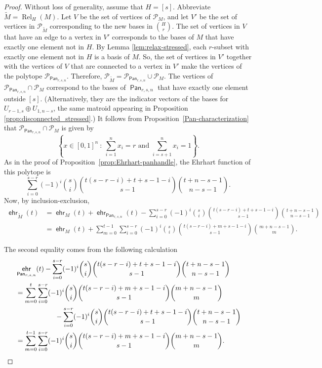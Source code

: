 \documentclass[11pt]{amsart}
\theoremstyle{definition}
\newcommand{\0}{\emptyset}
\newcommand{\Po}{\mathcal{P}}
\DeclareMathOperator{\ehr}{\mathsf{ehr}}
\DeclareMathOperator{\Rel}{Rel} %
\DeclareMathOperator{\Pan}{\mathsf{Pan}} %
\begin{document}
\begin{proof}
Without loss of generality, assume that $H=[s]$.
Abbreviate $\widetilde{M}=\Rel_H(M)$.
Let $V$ be the set of vertices of $\Po_{M}$, and let $V'$ be the set of vertices in $\Po_{\widetilde{M}}$ corresponding to the new bases in $\binom{H}{r}$.
The set of vertices in $V$ that have an edge to a vertex in $V'$ corresponds to the bases of $M$ that have exactly one element not in $H$.
By Lemma \ref{lem:relax-stressed}, each $r$-subset with exactly one element not in $H$ is a basis of $M$.
So, the set of vertices in $V'$ together with the vertices of $V$ that are connected to a vertex in $V'$ make the vertices of the polytope $\Po_{\Pan_{r,s,n}}$.
Therefore, $\Po_{\widetilde{M}}=\Po_{\Pan_{r,s,n}}\cup \Po_{M}$.
The vertices of $\Po_{\Pan_{r,s,n}}\cap \Po_{M}$ correspond to the bases of $\Pan_{r,s,n}$ that have exactly one element outside $[s]$. 
(Alternatively, they are the indicator vectors of the bases for  $U_{r-1,s}\oplus U_{1,n-s}$, the same matroid appearing in Proposition \ref{prop:disconnected_stressed}.)
It follows from Proposition~\ref{Pan-characterization} that $\Po_{\Pan_{r,s,n}}\cap \Po_{M}$ is given by
\[
\left\{x\in [0,1]^n\ :\ \sum_{i=1}^nx_i=r \textrm{ and } \sum_{i=s+1}^n x_i = 1\right\}.
\]
As in the proof of Proposition~\ref{prop:Ehrhart-panhandle}, the Ehrhart function of this polytope is
\[\sum_{i=0}^{s-r}(-1)^i\binom{s}{i}\binom{t(s-r-i)+t+s-1-i}{s-1}\binom{t+n-s-1}{n-s-1}.\]
Now, by inclusion-exclusion,
\begin{align*}
\ehr_{\widetilde{M}}(t)&=\ehr_M(t) + \ehr_{{\Pan_{r,s,n}}}(t) - \sum_{i=0}^{s-r}(-1)^i\binom{s}{i}\binom{t(s-r-i)+t+s-1-i}{s-1}\binom{t+n-s-1}{n-s-1}\\
&=\ehr_M(t) + \sum_{m=0}^{t-1}\sum_{i=0}^{s-r}(-1)^i\binom{s}{i}\binom{t(s-r-i)+m+s-1-i}{s-1}\binom{m+n-s-1}{m}.
\end{align*}

The second equality comes from the following calculation
\begin{align*}
&\ehr_{{\Pan_{r,s,n}}}(t)-\sum_{i=0}^{s-r}(-1)^i\binom{s}{i}\binom{t(s-r-i)+t+s-1-i}{s-1}\binom{t+n-s-1}{n-s-1}\\
&=\sum_{m=0}^t\sum_{i=0}^{s-r}(-1)^i\binom{s}{i}\binom{t(s-r-i)+m+s-1-i}{s-1}\binom{m+n-s-1}{m}\\
&\hspace{2cm}-\sum_{i=0}^{s-r}(-1)^i\binom{s}{i}\binom{t(s-r-i)+t+s-1-i}{s-1}\binom{t+n-s-1}{n-s-1}\\
&=\sum_{m=0}^{t-1}\sum_{i=0}^{s-r}(-1)^i\binom{s}{i}\binom{t(s-r-i)+m+s-1-i}{s-1}\binom{m+n-s-1}{m}.\qedhere
\end{align*}
\end{proof}
\end{document}
